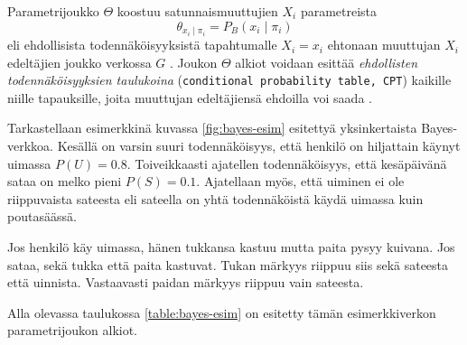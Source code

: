 Parametrijoukko $\Theta$ koostuu satunnaismuuttujien $X_i$ parametreista  
$$ 
    \theta_{x_i \mid \pi_i} = P_B(x_i \mid \pi_i) 
$$  
eli ehdollisista todennäköisyyksistä tapahtumalle $X_i = x_i$ ehtonaan muuttujan $X_i$ edeltäjien joukko verkossa $G$ \citep{ruggeri_bayesian_2008, myllymaki_bayes-verkkojen_1998}. Joukon $\Theta$ alkiot voidaan esittää \emph{ehdollisten todennäköisyyksien taulukoina} (\texttt{conditional probability table, CPT}) kaikille niille tapauksille, joita muuttujan edeltäjiensä ehdoilla voi saada \citep{zhang_brief_2019}. 

Tarkastellaan esimerkkinä kuvassa \ref{fig:bayes-esim} esitettyä yksinkertaista Bayes-verkkoa. Kesällä on varsin suuri todennäköisyys, että henkilö on hiljattain käynyt uimassa $P(U) = 0.8$. Toiveikkaasti ajatellen todennäköisyys, että kesäpäivänä sataa on melko pieni $P(S) = 0.1$. Ajatellaan myös, että uiminen ei ole riippuvaista sateesta eli sateella on yhtä todennäköistä käydä uimassa kuin poutasäässä. 

\begin{center} 
\end{center} 

Jos henkilö käy uimassa, hänen tukkansa kastuu mutta paita pysyy kuivana. Jos sataa, sekä tukka että paita kastuvat. Tukan märkyys riippuu siis sekä sateesta että uinnista. Vastaavasti paidan märkyys riippuu vain sateesta.  

Alla olevassa taulukossa \ref{table:bayes-esim} on esitetty tämän esimerkkiverkon parametrijoukon alkiot. 

